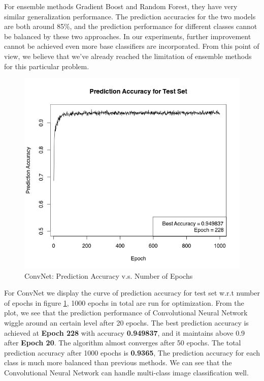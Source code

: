 \documentclass[11pt,oneside,a4paper]{article}
\numberwithin{equation}{section}
\begin{document}
For ensemble methods Gradient Boost and Random Forest, they have very similar generalization performance. The prediction accuracies for the two models are both around 85\%, and the prediction performance for different classes cannot be balanced by these two approaches. In our experiments, further improvement cannot be achieved even more base classifiers are incorporated. From this point of view, we believe that we've already reached the limitation of ensemble methods for this particular problem.

\begin{figure}[ht!]
\centering
\includegraphics[width=0.6\linewidth]{Rplot.png}
\caption{ConvNet: Prediction Accuracy v.s. Number of Epochs}
\label{fig:cnn}
\end{figure}

For ConvNet we display the curve of prediction accuracy for test set w.r.t number of epochs in figure \ref{fig:cnn}, 1000 epochs in total are run for optimization. From the plot, we see that the prediction performance of Convolutional Neural Network wiggle around an certain level after 20 epochs. The best prediction accuracy is achieved at \textbf{Epoch 228} with accuracy \textbf{0.949837}, and it maintains above 0.9 after \textbf{Epoch 20}. The algorithm almost converges after 50 epochs. The total prediction accuracy after 1000 epochs is \textbf{0.9365}, The prediction accuracy for each class is much more balanced than previous methods. We can see that the Convolutional Neural Network can handle multi-class image classification well.
\end{document}
